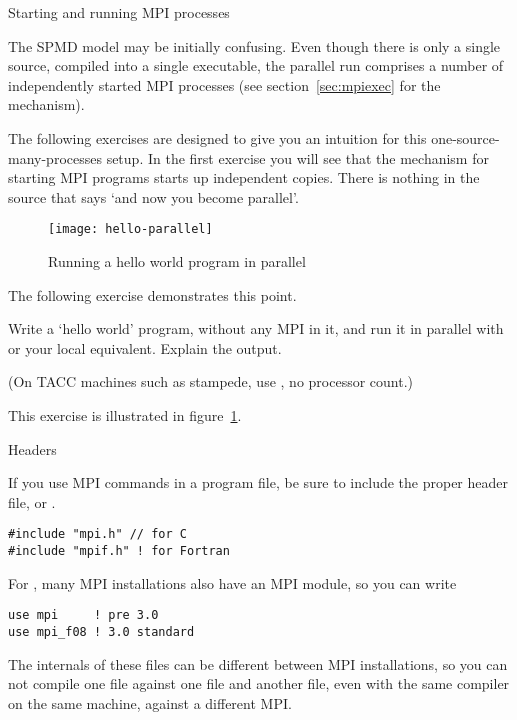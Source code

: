 
 {Starting and running MPI processes}
\label{sec:mpi-start}

The \ac{SPMD} model may be initially confusing. Even though there is
only a single source, compiled into a single executable,
the parallel run comprises a number of independently started MPI
processes (see section~\ref{sec:mpiexec} for the mechanism).

The following exercises are designed to give you an intuition for this
one-source-many-processes setup. In the first exercise you will see
that the mechanism for starting MPI programs starts up independent
copies. There is nothing in the source that says `and now you become parallel'.

\begin{figure}[ht]
  \texttt{[image: hello-parallel]}
  \caption{Running a hello world program in parallel}
  \label{fig:hello-parallel}
\end{figure}

The following exercise demonstrates this point.


\begin{exercise}
  \label{ex:hello1}
  Write a `hello world' program, without any MPI in it,
  and run it in parallel with  or your local equivalent. 
  Explain the output.

\begin{tacc}
    (On TACC machines such as stampede, use , no
    processor count.)
\end{tacc}

\end{exercise}

This exercise is illustrated in figure~\ref{fig:hello-parallel}.

 {Headers}

If you use MPI commands in a program file, be sure to include
the proper header file,  or .
\begin{verbatim}
#include "mpi.h" // for C
#include "mpif.h" ! for Fortran
\end{verbatim}
For , many MPI installations
also have an MPI module, so you can write
\begin{verbatim}
use mpi     ! pre 3.0
use mpi_f08 ! 3.0 standard
\end{verbatim}
The internals of these files can be different between MPI
installations, so you can not compile one file against one 
file and another file, even with the same compiler on the same machine,
against a different MPI.

